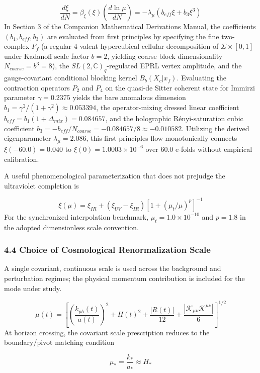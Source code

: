 \documentclass[aps,prd,onecolumn,superscriptaddress,nofootinbib,longbibliography,10pt]{revtex4-2}
\begin{document}
  \[ \frac{d\xi}{dN} = \beta_\xi(\xi)\left(\frac{d\ln\mu}{dN}\right) = -\lambda_\mu (b_{eff}\xi + b_3 \xi^3) \]
  In Section 3 of the Companion Mathematical Derivations Manual, the coefficients \((b_1, b_{eff}, b_3)\) are evaluated from first principles by specifying the fine two-complex \(F_f\) (a regular \(4\)-valent hypercubical cellular decomposition of \(\Sigma \times [0,1]\) under Kadanoff scale factor \(b = 2\), yielding coarse block dimensionality \(N_{coarse} = b^3 = 8\)), the \(SL(2,\mathbb{C})_q\)-regulated EPRL vertex amplitude, and the gauge-covariant conditional blocking kernel \(B_b(X_c|x_f)\). Evaluating the contraction operators \(P_2\) and \(P_4\) on the quasi-de Sitter coherent state for Immirzi parameter \(\gamma = 0.2375\) yields the bare anomalous dimension \(b_1 = \gamma^2/(1+\gamma^2) \approx 0.053394\), the operator-mixing dressed linear coefficient \(b_{eff} = b_1(1 + \Delta_{mix}) = 0.084657\), and the holographic Rényi-saturation cubic coefficient \(b_3 = -b_{eff}/N_{coarse} = -0.084657/8 \approx -0.010582\). Utilizing the derived eigenparameter \(\lambda_\mu = 2.086\), this first-principles flow monotonically connects \(\xi(-60.0) = 0.040\) to \(\xi(0) = 1.0003 \times 10^{-6}\) over 60.0 e-folds without empirical calibration.


  A useful phenomenological parameterization that does not prejudge the ultraviolet completion is


  \[ \xi(\mu) = \xi_{IR} + (\xi_{UV} - \xi_{IR})[1 + (\mu_t/\mu)^p]^{-1} \]
  For the synchronized interpolation benchmark, \(\mu_t = 1.0 \times 10^{-10}\) and \(p = 1.8\) in the adopted dimensionless scale convention.



  
\subsubsection*{4.4 Choice of Cosmological Renormalization Scale}

  A single covariant, continuous scale is used across the background and perturbation regimes; the physical momentum contribution is included for the mode under study.


  \[ \mu(t) = \left[ \left(\frac{k_{ph}(t)}{a(t)}\right)^2 + H(t)^2 + \frac{|R(t)|}{12} + \frac{|\mathcal{K}_{\mu\nu}\mathcal{K}^{\mu\nu}|}{6} \right]^{1/2} \]
  At horizon crossing, the covariant scale prescription reduces to the boundary/pivot matching condition


  \[ \mu_* = \frac{k_*}{a_*} \approx H_* \]
\end{document}
